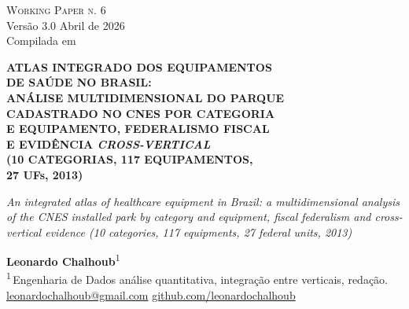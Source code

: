 \documentclass[12pt,a4paper,oneside]{article}
\begin{document}
\begin{titlepage}
  \begin{center}
    \vspace*{1.5cm}
    {\small\textsc{Working Paper n. 6}}\\
    {\small Versão 3.0 \textemdash{} Abril de 2026}\\[2pt]
    {\footnotesize Compilada em \COMPILESTAMP\ \textbullet\ \texttt{\COMPILESHA}}

    \vfill

    {\LARGE\bfseries
     ATLAS INTEGRADO DOS EQUIPAMENTOS\\
     DE SAÚDE NO BRASIL:\\
     ANÁLISE MULTIDIMENSIONAL DO PARQUE\\
     CADASTRADO NO CNES POR CATEGORIA\\
     E EQUIPAMENTO, FEDERALISMO FISCAL\\
     E EVIDÊNCIA \textit{CROSS-VERTICAL}\\
     (10 CATEGORIAS, 117 EQUIPAMENTOS,\\
     27 UFs, 2013)}

    \vspace{1cm}
    {\large\itshape
     An integrated atlas of healthcare equipment in Brazil: a
     multidimensional analysis of the CNES installed park by
     category and equipment, fiscal federalism and cross-vertical
     evidence (10 categories, 117 equipments, 27 federal units,
     2013)}

    \vfill

    {\large\textbf{Leonardo Chalhoub}\textsuperscript{1}}\\[6pt]
    {\small\textsuperscript{1}\,Engenharia de Dados \textemdash{}
     análise quantitativa, integração entre verticais, redação.}\\[6pt]
    {\small\href{mailto:leonardochalhoub@gmail.com}{leonardochalhoub@gmail.com}
     \quad\textbullet\quad
     \href{https://github.com/leonardochalhoub}{github.com/leonardochalhoub}}

    \vfill


\end{center}
\end{titlepage}
\end{document}
